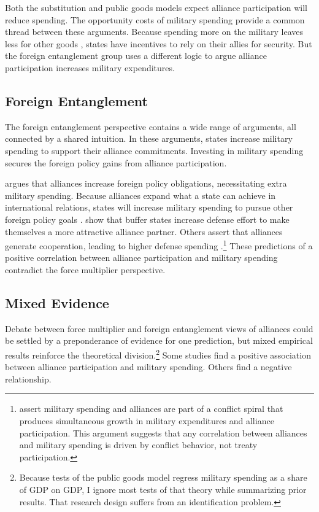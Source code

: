 \documentclass[12pt]{article}
\begin{document}
Both the substitution and public goods models expect alliance participation will reduce spending. 
The opportunity costs of military spending provide a common thread between these arguments. 
Because spending more on the military leaves less for other goods \citep{Fordham1998}, states have incentives to rely on their allies for security. 
But the foreign entanglement group uses a different logic to argue alliance participation increases military expenditures. 


\subsection{Foreign Entanglement}


The foreign entanglement perspective contains a wide range of arguments, all connected by a shared intuition. 
In these arguments, states increase military spending to support their alliance commitments. 
Investing in military spending secures the foreign policy gains from alliance participation. 


\citet{Diehl1994} argues that alliances increase foreign policy obligations, necessitating extra military spending. 
Because alliances expand what a state can achieve in international relations, states will increase military spending to pursue other foreign policy goals \citep{MorganPalmer2006}. 
\citet{Horowitzetal2017} show that buffer states increase defense effort to make themselves a more attractive alliance partner. 
Others assert that alliances generate cooperation, leading to higher defense spending \citep{Palmer1990, QuirozFlores2011}.\footnote{
\citet{SeneseVasquez2008} assert military spending and alliances are part of a conflict spiral that produces simultaneous growth in military expenditures and alliance participation. 
This argument suggests that any correlation between alliances and military spending is driven by conflict behavior, not treaty participation.
}
These predictions of a positive correlation between alliance participation and military spending contradict the force multiplier perspective. 


\subsection{Mixed Evidence} 


Debate between force multiplier and foreign entanglement views of alliances could be settled by a preponderance of evidence for one prediction, but mixed empirical results reinforce the theoretical division.\footnote{
Because tests of the public goods model regress military spending as a share of GDP on GDP, I ignore most tests of that theory while summarizing prior results. That research design suffers from an identification problem.}
Some studies find a positive association between alliance participation and military spending. 
Others find a negative relationship. 
\end{document}
